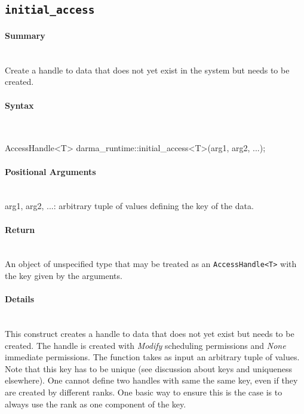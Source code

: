 \subsection{\texttt{initial\_access}}

\paragraph{Summary}\mbox{}\\ 
Create a handle to data that does not yet exist in the system 
but needs to be created.

\paragraph{Syntax}\mbox{}\\ 
\begin{CppCode}
AccessHandle<T> darma_runtime::initial_access<T>(arg1, arg2, ...);
\end{CppCode}

\paragraph{Positional Arguments}\mbox{}\\ 
arg1, arg2, ...: arbitrary tuple of values defining the key of the data.

\paragraph{Return}\mbox{}\\ 
An object of unspecified type that may be treated as an \texttt{AccessHandle<T>}
with the key given by the arguments.

\paragraph{Details}\mbox{}\\ 
This construct creates a handle to data that does not yet 
exist but needs to be created.  The handle is created with {\it Modify}
scheduling permissions and {\it None} immediate permissions.  The function takes
as input an arbitrary tuple of values.
Note that this key has to be unique (see discussion about keys and uniqueness
elsewhere).  One cannot define two
handles with same the same key, even if they are created by different ranks.
One basic way to ensure this is the case is to always use the rank 
as one component of the key. 

